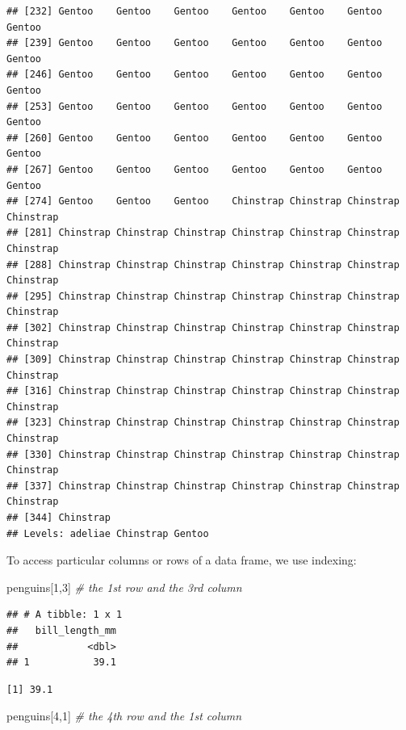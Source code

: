 \documentclass[
]{book}
\newenvironment{Shaded}{\begin{snugshade}}{\end{snugshade}}
\newcommand{\CommentTok}[1]{\textcolor[rgb]{0.56,0.35,0.01}{\textit{#1}}}
\newcommand{\DecValTok}[1]{\textcolor[rgb]{0.00,0.00,0.81}{#1}}
\newcommand{\NormalTok}[1]{#1}
\begin{document}
\begin{verbatim}
## [232] Gentoo    Gentoo    Gentoo    Gentoo    Gentoo    Gentoo    Gentoo   
## [239] Gentoo    Gentoo    Gentoo    Gentoo    Gentoo    Gentoo    Gentoo   
## [246] Gentoo    Gentoo    Gentoo    Gentoo    Gentoo    Gentoo    Gentoo   
## [253] Gentoo    Gentoo    Gentoo    Gentoo    Gentoo    Gentoo    Gentoo   
## [260] Gentoo    Gentoo    Gentoo    Gentoo    Gentoo    Gentoo    Gentoo   
## [267] Gentoo    Gentoo    Gentoo    Gentoo    Gentoo    Gentoo    Gentoo   
## [274] Gentoo    Gentoo    Gentoo    Chinstrap Chinstrap Chinstrap Chinstrap
## [281] Chinstrap Chinstrap Chinstrap Chinstrap Chinstrap Chinstrap Chinstrap
## [288] Chinstrap Chinstrap Chinstrap Chinstrap Chinstrap Chinstrap Chinstrap
## [295] Chinstrap Chinstrap Chinstrap Chinstrap Chinstrap Chinstrap Chinstrap
## [302] Chinstrap Chinstrap Chinstrap Chinstrap Chinstrap Chinstrap Chinstrap
## [309] Chinstrap Chinstrap Chinstrap Chinstrap Chinstrap Chinstrap Chinstrap
## [316] Chinstrap Chinstrap Chinstrap Chinstrap Chinstrap Chinstrap Chinstrap
## [323] Chinstrap Chinstrap Chinstrap Chinstrap Chinstrap Chinstrap Chinstrap
## [330] Chinstrap Chinstrap Chinstrap Chinstrap Chinstrap Chinstrap Chinstrap
## [337] Chinstrap Chinstrap Chinstrap Chinstrap Chinstrap Chinstrap Chinstrap
## [344] Chinstrap
## Levels: adeliae Chinstrap Gentoo
\end{verbatim}

To access particular columns or rows of a data frame, we use indexing:

\begin{Shaded}
\begin{Highlighting}[]
\NormalTok{penguins[}\DecValTok{1}\NormalTok{,}\DecValTok{3}\NormalTok{] }\CommentTok{# the 1st row and the 3rd column}
\end{Highlighting}
\end{Shaded}

\begin{verbatim}
## # A tibble: 1 x 1
##   bill_length_mm
##            <dbl>
## 1           39.1
\end{verbatim}

\begin{verbatim}
[1] 39.1
\end{verbatim}

\begin{Shaded}
\begin{Highlighting}[]
\NormalTok{penguins[}\DecValTok{4}\NormalTok{,}\DecValTok{1}\NormalTok{] }\CommentTok{# the 4th row and the 1st column}
\end{Highlighting}
\end{Shaded}
\end{document}
